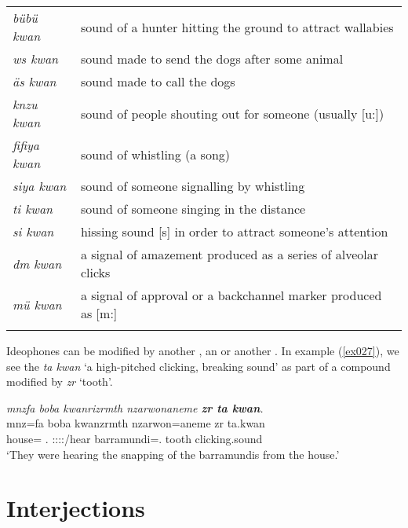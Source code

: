 {\begin{table}
\begin{tabularx}{\textwidth}{Xl}
		\tablevspace
		\multicolumn{2}{l}{{human made signal sounds}}\\ \midrule
		\emph{bübü kwan}&sound of a hunter hitting the ground to attract wallabies\\
		\emph{ws kwan}&sound made to send the dogs after some animal\\
		\emph{äs kwan}&sound made to call the dogs\\
		\emph{knzu kwan}&sound of people shouting out for someone (usually [u:])\\
		\emph{fifiya kwan}&sound of whistling (a song)\\
		\emph{siya kwan}&sound of someone signalling by whistling\\
		\emph{ti kwan}&sound of someone singing in the distance\\
		\emph{si kwan}&hissing sound [s] in order to attract someone's attention\\
		\emph{dm kwan}&a signal of amazement produced as a series of alveolar clicks\\
		\emph{mü kwan}&a signal of approval or a backchannel marker produced as [m:]\\
		\lspbottomrule
	\end{tabularx}
\end{table}}%

Ideophones can be modified by another , an  or another . In example (\ref{ex027}), we see the  \emph{ta kwan} `a high-pitched clicking, breaking sound' as part of a compound modified by \emph{zr} `tooth'.

\begin{exe}
	\ex \emph{mnzfa boba kwanrizrmth nzarwonaneme \textbf{zr ta kwan}.}\\
	\gll mnz=fa boba kwanzrmth nzarwon=aneme zr ta.kwan\\
	house={\Abl} \Med{}.{\Abl} \Stpl:\Sbj:\Pst:\Dur:\Venit/hear barramundi={\Poss}.{\Nsg} tooth {clicking.sound}\\
	\trans `They were hearing the snapping of the barramundis from the house.'\\ 
	\label{ex027}
\end{exe}

\section{Interjections} \label{interjections-sec}

